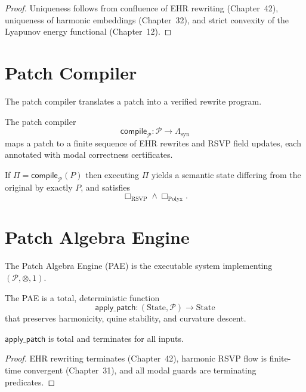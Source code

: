 \begin{proof}
Uniqueness follows from confluence of EHR rewriting (Chapter~42), uniqueness of
harmonic embeddings (Chapter~32), and strict convexity of the Lyapunov energy
functional (Chapter~12).
\end{proof}


\section{Patch Compiler}
\label{sec:52:compiler}

The patch compiler translates a patch into a verified rewrite program.

\begin{definition}
The patch compiler
\[
\mathsf{compile}_{\mathcal{P}} : \mathcal{P} \longrightarrow \Lambda_{\mathrm{syn}}
\]
maps a patch to a finite sequence of EHR rewrites and RSVP field updates,
each annotated with modal correctness certificates.
\end{definition}

\begin{theorem}
If $\Pi = \mathsf{compile}_{\mathcal{P}}(P)$ then executing $\Pi$ yields a
semantic state differing from the original by exactly $P$, and satisfies
\[
\Box_{\mathrm{RSVP}} \land \Box_{\mathrm{Polyx}}.
\]
\end{theorem}


\section{Patch Algebra Engine}
\label{sec:52:engine}

The Patch Algebra Engine (PAE) is the executable system implementing
$(\mathcal{P},\otimes,1)$.

\begin{definition}
The PAE is a total, deterministic function
\[
\mathsf{apply\_patch} :
(\mathrm{State},\mathcal{P}) \longrightarrow \mathrm{State}
\]
that preserves harmonicity, quine stability, and curvature descent.
\end{definition}

\begin{theorem}[Totality]
$\mathsf{apply\_patch}$ is total and terminates for all inputs.
\end{theorem}

\begin{proof}
EHR rewriting terminates (Chapter~42), harmonic RSVP flow is finite-time
convergent (Chapter~31), and all modal guards are terminating predicates.
\end{proof}

